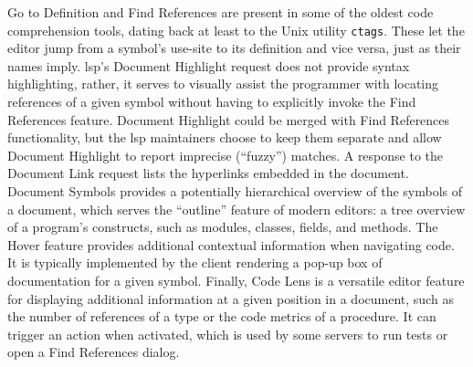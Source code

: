 Go to Definition and Find References are
present in some of the oldest code comprehension tools, dating back at least to
the Unix utility \texttt{ctags}\cite{exuberant_ctags}. These let the editor jump
from a symbol's use-site to its definition and vice versa, just as their names
imply. \acrshort{lsp}'s Document Highlight request does not provide syntax
highlighting, rather, it serves to visually assist the programmer with locating
references of a given symbol without having to explicitly invoke the Find
References feature. Document Highlight could be merged with Find References
functionality, but the \acrshort{lsp} maintainers choose to keep them separate
and allow Document Highlight to report imprecise (``fuzzy'') matches. A response
to the Document Link request lists the hyperlinks embedded in the document.
Document Symbols provides a potentially hierarchical overview of the symbols of
a document, which serves the ``outline'' feature of modern editors: a tree
overview of a program's constructs, such as modules, classes, fields, and
methods. The Hover feature provides additional contextual information when
navigating code. It is typically implemented by the client rendering a pop-up
box of documentation for a given symbol. Finally, Code Lens is a versatile
editor feature for displaying additional information at a given position in a
document, such as the number of references of a type or the code metrics of a
procedure\cite{codelens_comparison}. It can trigger an action when activated,
which is used by some servers to run tests or open a Find References dialog.

